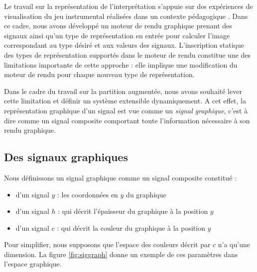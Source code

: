 \documentclass{article}
\begin{document}
Le travail sur la représentation de l'interprétation s'appuie sur des expériences de visualisation du jeu instrumental réalisées dans un contexte pédagogique \cite{daudin07}. Dans ce cadre, nous avons développé un moteur de rendu graphique prenant des signaux ainsi qu'un type de représentation en entrée pour calculer l'image correspondant au type désiré et aux valeurs des signaux. L'inscription statique des types de représentation supportés dans le moteur de rendu constitue une des limitations importante de cette approche : elle implique une modification du moteur de rendu pour chaque nouveau type de représentation. 

Dans le cadre du travail sur la partition augmentée, nous avons souhaité lever cette limitation et définir un système extensible dynamiquement. A cet effet, la représentation graphique d'un signal est vue comme un \emph{signal graphique}, c'est à dire comme un signal composite comportant toute l'information nécessaire à son rendu graphique.


\subsection{Des signaux graphiques}

Nous définissons un signal graphique comme un signal composite constitué :
\begin{itemize}
\item d'un signal $y$ : les coordonnées en $y$ du graphique
\item d'un signal $h$ : qui décrit l'épaisseur du graphique à la position $y$
\item d'un signal $c$ : qui décrit la couleur du graphique à la position $y$
\end{itemize}
Pour simplifier, nous supposons que l'espace des couleurs décrit par $c$ n'a qu'une dimension. 
La figure \ref{fig:siggraph} donne un exemple de ces paramètres dans l'espace graphique. 
\end{document}
